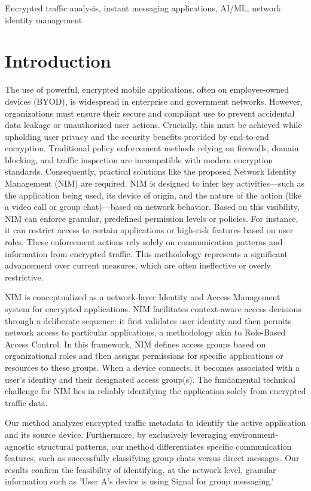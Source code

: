\documentclass[conference]{IEEEtran}
\begin{document}
\begin{IEEEkeywords}
Encrypted traffic analysis, instant messaging applications, AI/ML, network identity management 
\end{IEEEkeywords}

\section{Introduction}
The use of powerful, encrypted mobile applications, often on employee-owned devices (BYOD), is widespread in enterprise and government networks. However, organizations must ensure their secure and compliant use to prevent accidental data leakage or unauthorized user actions. Crucially, this must be achieved while upholding user privacy and the security benefits provided by end-to-end encryption. Traditional policy enforcement methods relying on firewalls, domain blocking, and traffic inspection are incompatible with modern encryption standards. Consequently, practical solutions like the proposed Network Identity Management (NIM) are required. NIM is designed to infer key activities—such as the application being used, its device of origin, and the nature of the action (like a video call or group chat)—based on network behavior. Based on this visibility, NIM can enforce granular, predefined permission levels or policies. For instance, it can restrict access to certain applications or high-risk features based on user roles. These enforcement actions rely solely on communication patterns and information from encrypted traffic. This methodology represents a significant advancement over current measures, which are often ineffective or overly restrictive.

NIM is conceptualized as a network-layer Identity and Access Management system for encrypted applications. NIM facilitates context-aware access decisions through a deliberate sequence: it first validates user identity and then permits network access to particular applications, a methodology akin to Role-Based Access Control. In this framework, NIM defines access groups based on organizational roles and then assigns permissions for specific applications or resources to these groups. When a device connects, it becomes associated with a user's identity and their designated access group(s). The fundamental technical challenge for NIM lies in reliably identifying the application solely from encrypted traffic data.

Our method analyzes encrypted traffic metadata to identify the active application and its source device. Furthermore, by exclusively leveraging environment-agnostic structural patterns, our method differentiates specific communication features, such as successfully classifying group chats versus direct messages. Our results confirm the feasibility of identifying, at the network level, granular information such as 'User A's device is using Signal for group messaging.'
\end{document}
